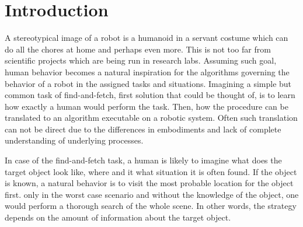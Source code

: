 ﻿%
\chapter{Introduction}
\label{Introduction.ch}
A stereotypical image of a robot is a humanoid in a servant costume which can do all the chores at home and perhaps even more. 
This is not too far from scientific projects which are being run in research labs. 
Assuming such goal, human behavior becomes a natural inspiration for the algorithms governing the behavior of a robot in the 
assigned tasks and situations.
Imagining a simple but common task of find-and-fetch, first solution that could be thought of, is to learn how exactly a human 
would perform the task. 
Then, how the procedure can be translated to an algorithm executable on a robotic system.
Often such translation can not be direct due to the differences in embodiments and lack of complete understanding of underlying 
processes. 

In case of the find-and-fetch task, a human is likely to imagine what does the target object look like, where and it what situation 
it is often found.
If the object is known, a natural behavior is to visit the most probable location for the object first.
only in the worst case scenario and without the knowledge of the object, one would perform a thorough search of the whole scene.
In other words, the strategy depends on the amount of information about the target object. 

